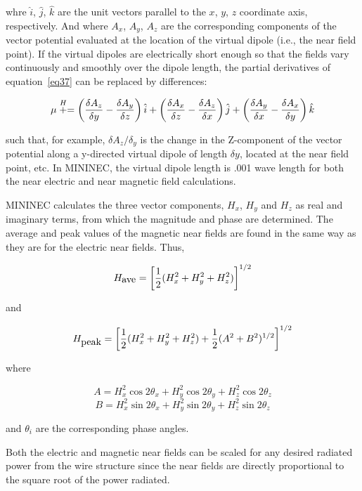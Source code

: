 \documentclass[12pt]{article}
\begin{document}
whre $\hat{i}$, $\hat{j}$, $\hat{k}$ are the unit vectors parallel to
the $x$, $y$, $z$ coordinate axis, respectively. And where $A_x$, $A_y$,
$A_z$ are the corresponding components of the vector potential evaluated
at the location of the virtual dipole (i.e., the near field point). If
the virtual dipoles are electrically short enough so that the fields
vary continuously and smoothly over the dipole length, the partial
derivatives of equation~\eqref{eq37} can be replaced by differences:

\begin{equation}
\mu\stackrel{H}{+} =
\left(\frac{\delta A_z}{\delta y} - \frac{\delta A_y}{\delta z}\right)
\hat{i} +
\left(\frac{\delta A_x}{\delta z} - \frac{\delta A_z}{\delta x}\right)
\hat{j}+
\left(\frac{\delta A_y}{\delta x} - \frac{\delta A_x}{\delta y}\right)
\hat{k}
\label{eq38}
\end{equation}

such that, for example, $\delta A_z/\delta_y$ is the change in the
Z-component of the vector potential along a y-directed virtual dipole of
length $\delta y$, located at the near field point, etc. In MININEC, the
virtual dipole length is .001 wave length for both the near electric and
near magnetic field calculations.

MININEC calculates the three vector components, $H_x$, $H_y$ and $H_z$
as real and imaginary terms, from which the magnitude and phase are
determined. The average and peak values of the magnetic near fields are
found in the same way as they are for the electric near fields. Thus,

\begin{equation}
H_{\mbox{ave}} = \left[\frac{1}{2}(H_x^2 + H_y^2 + H_z^2)\right]^{1/2}
\label{eq39}
\end{equation}

and

\begin{equation}
H_{\mbox{peak}} = \left[\frac{1}{2}(H_x^2 + H_y^2 + H_z^2)
                +\frac{1}{2}(A^2 + B^2)^{1/2} \right]^{1/2}
\label{eq40}
\end{equation}

where

\[ A = H_x^2\cos 2\theta_x + H_y^2\cos2\theta_y + H_z^2\cos2\theta_z
\]
\[ B = H_x^2\sin 2\theta_x + H_y^2\sin2\theta_y + H_z^2\sin2\theta_z
\]

and $\theta_i$ are the corresponding phase angles.

Both the electric and magnetic near fields can be scaled for any desired
radiated power from the wire structure since the near fields are
directly proportional to the square root of the power radiated.
\end{document}

